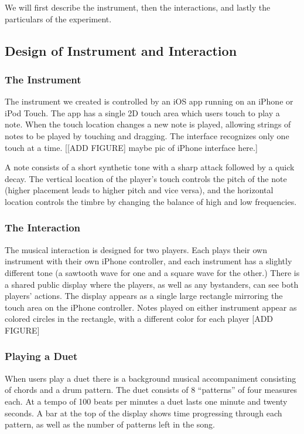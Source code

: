 \documentclass{article}
\begin{document}
We will first describe the instrument, then the interactions, and lastly the particulars of the experiment.


\subsection{Design of Instrument and Interaction}

\subsubsection{The Instrument}

The instrument we created is controlled by an iOS app running on an iPhone or iPod Touch. The app has a single 2D touch area which users touch to play a note. When the touch location changes a new note is played, allowing strings of notes to be played by touching and dragging.  The interface recognizes only one touch at a time. [[ADD FIGURE] maybe pic of iPhone interface here.]

A note consists of a short synthetic tone with a sharp attack followed by a quick decay.  The vertical location of the player's touch controls the pitch of the note (higher placement leads to higher pitch and vice versa), and the horizontal location controls the timbre by changing the balance of high and low frequencies.

\subsubsection{The Interaction}

The musical interaction is designed for two players.  Each plays their own instrument with their own iPhone controller, and each instrument has a slightly different tone (a sawtooth wave for one and a square wave for the other.)  There is a shared public display where the players, as well as any bystanders, can see both players' actions.  The display appears as a single large rectangle mirroring the touch area on the iPhone controller.  Notes played on either instrument appear as colored circles in the rectangle, with a different color for each player [ADD FIGURE]

\subsubsection{Playing a Duet}

When users play a duet there is a background musical accompaniment consisting of chords and a drum pattern.  The duet consists of 8 ``patterns'' of four measures each.  At a tempo of 100 beats per minutes a duet lasts one minute and twenty seconds.  A bar at the top of the display shows time progressing through each pattern, as well as the number of patterns left in the song.  
\end{document}

